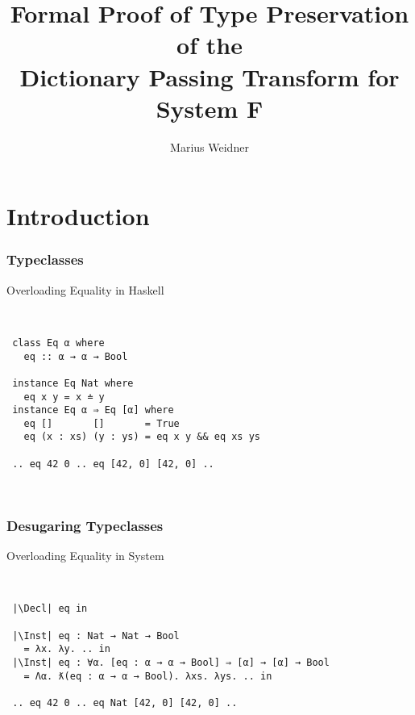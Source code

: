 \documentclass[aspectratio=169]{beamer}
\title[Formal Dictionary Passing Transform]{Formal Proof of Type Preservation of the\\Dictionary Passing Transform for System F}
\institute[Uni Freiburg]{Chair of Programming Languages, University of Freiburg}
\author{Marius Weidner}
\begin{document}




\begin{frame}
  \titlepage
\end{frame}

\section{Introduction}

\begin{frame}[fragile]
  \frametitle{Typeclasses}
  \begin{block}{Overloading Equality in Haskell}
    \begin{center}
      ~
      \begin{verbatim}
 class Eq α where
   eq :: α → α → Bool
 
 instance Eq Nat where
   eq x y = x ≐ y
 instance Eq α ⇒ Eq [α] where
   eq []       []       = True
   eq (x : xs) (y : ys) = eq x y && eq xs ys 
     
 .. eq 42 0 .. eq [42, 0] [42, 0] ..
      \end{verbatim}
      ~
    \end{center}
  \end{block}
\end{frame}

\begin{frame}[fragile]
  \frametitle{Desugaring Typeclasses}
  \begin{block}{Overloading Equality in System \Fo}
    \begin{center}
      ~
      \begin{verbatim}
 |\Decl| eq in

 |\Inst| eq : Nat → Nat → Bool 
   = λx. λy. .. in
 |\Inst| eq : ∀α. [eq : α → α → Bool] ⇒ [α] → [α] → Bool 
   = Λα. ƛ(eq : α → α → Bool). λxs. λys. .. in
    
 .. eq 42 0 .. eq Nat [42, 0] [42, 0] .. 
      \end{verbatim}
      ~
    \end{center}
  \end{block}
\end{frame}
\end{document}
